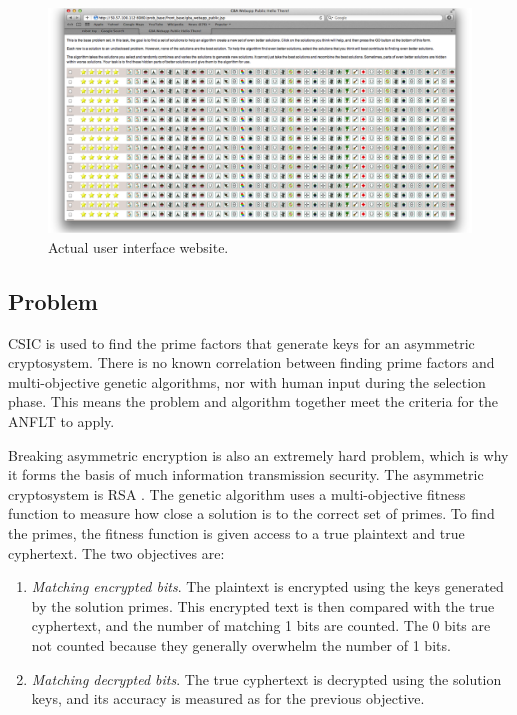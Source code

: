 \begin{figure}[!t]
  \centering
  \includegraphics[width=4.5in]{HollowayWebsiteUI}
  \caption{Actual user interface website.}
  \label{fig:website_UI}
\end{figure}

\subsection{Problem}\label{sec:problem}

CSIC is used to find the prime factors that generate keys for an asymmetric cryptosystem.  There is no known correlation between finding prime factors and multi-objective genetic algorithms, nor with human input during the selection phase.  This means the problem and algorithm together meet the criteria for the ANFLT to apply. 

Breaking asymmetric encryption is also an extremely hard problem, which is why it forms the basis of much information transmission security.  The asymmetric cryptosystem is RSA \citep{cormen01:_introd_to_algor}.  The genetic algorithm uses a multi-objective fitness function to measure how close a solution is to the correct set of primes.  To find the primes, the fitness function is given access to a true plaintext and true cyphertext. The two objectives are:

\begin{enumerate}
\item \emph{Matching encrypted bits}. The plaintext is encrypted using the keys generated by the solution primes.  This encrypted text is then compared with the true cyphertext, and the number of matching 1 bits are counted.  The 0 bits are not counted because they generally overwhelm the number of 1 bits.

\item \emph{Matching decrypted bits}. The true cyphertext is decrypted using the solution keys, and its accuracy is measured as for the previous objective.
\end{enumerate}

